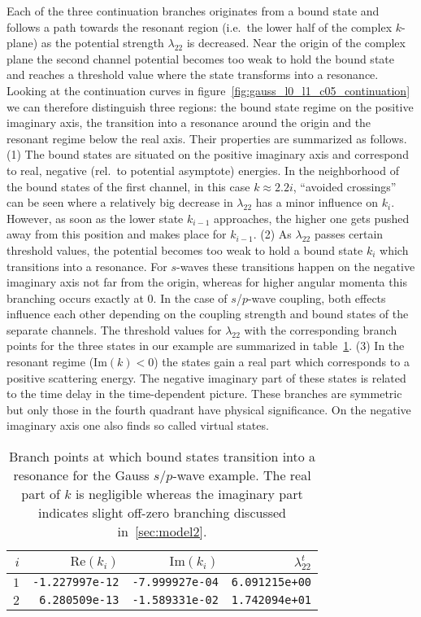\documentclass[mathpazo]{cicp}
\begin{document}
Each of the three continuation branches originates from a bound state and follows a path towards the resonant region (i.e.\ the lower half of the complex $k$-plane) 
as the potential strength $\lambda_{22}$ is decreased. Near the origin of the complex plane the second channel potential becomes too weak to hold the bound state 
and reaches a threshold value where the state transforms into a resonance. Looking at the continuation curves in figure~\ref{fig:gauss_l0_l1_c05_continuation} we 
can therefore distinguish three regions: the bound state regime on the positive imaginary axis, the transition into a resonance around the origin and the resonant 
regime below the real axis. Their properties are summarized as follows. (1) The bound states are situated on the positive imaginary axis and correspond to real, 
negative (rel.\ to potential asymptote) energies. In the neighborhood of the bound states of the first channel, in this case $k\approx 2.2i$, ``avoided crossings'' can 
be seen where a relatively big decrease in $\lambda_{22}$ has a minor influence on $k_{i}$. However, as soon as the lower state $k_{i-1}$ approaches, the 
higher one gets pushed away from this position and makes place for $k_{i-1}$. (2) As $\lambda_{22}$ passes certain threshold values, the potential becomes 
too weak to hold a bound state $k_{i}$ which transitions into a resonance. For $s$-waves these transitions happen on the negative imaginary axis not far from 
the origin, whereas for higher angular momenta this branching occurs exactly at 0. In the case of $s$/$p$-wave coupling, both effects influence each other 
depending on the coupling strength and bound states of the separate channels. The threshold values for $\lambda_{22}$ with the corresponding branch 
points for the three states in our example are summarized in table~\ref{tab:branchpoints}. (3) In the resonant regime ($\text{Im}(k)<0$) the states gain a real part which 
corresponds to a positive scattering energy. The negative imaginary part of these states is related to the time delay in the time-dependent picture. These 
branches are symmetric but only those in the fourth quadrant have physical significance. On the negative imaginary axis one also finds
so called virtual states.

\begin{table}[h!]
	\centering
	\begin{tabular}{r|r|r|r}
		$i$ & $\text{Re}(k_{i})$ & $\text{Im}(k_{i})$ & $\lambda_{22}^{t}$ \\
		\hline
		$1$ & \texttt{-1.227997e-12} & \texttt{-7.999927e-04} & \texttt{6.091215e+00} \\
		$2$ & \texttt{6.280509e-13} & \texttt{-1.589331e-02} & \texttt{1.742094e+01}
	\end{tabular}
	\caption{Branch points at which bound states transition into a resonance for the Gauss $s$/$p$-wave example. The real part of $k$ is negligible whereas the imaginary part indicates slight off-zero branching discussed in~\ref{sec:model2}.}
	\label{tab:branchpoints}
\end{table}
\end{document}
